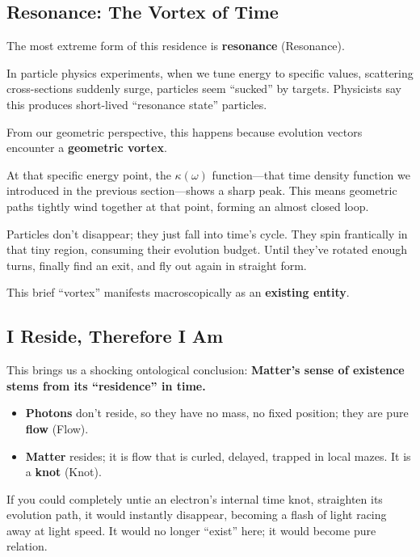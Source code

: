 \subsection{Resonance: The Vortex of Time}

The most extreme form of this residence is \textbf{resonance} (Resonance).

In particle physics experiments, when we tune energy to specific values, scattering cross-sections suddenly surge, particles seem ``sucked'' by targets. Physicists say this produces short-lived ``resonance state'' particles.

From our geometric perspective, this happens because evolution vectors encounter a \textbf{geometric vortex}.

At that specific energy point, the $\kappa(\omega)$ function---that time density function we introduced in the previous section---shows a sharp peak. This means geometric paths tightly wind together at that point, forming an almost closed loop.

Particles don't disappear; they just fall into time's cycle. They spin frantically in that tiny region, consuming their evolution budget. Until they've rotated enough turns, finally find an exit, and fly out again in straight form.

This brief ``vortex'' manifests macroscopically as an \textbf{existing entity}.

\subsection{I Reside, Therefore I Am}

This brings us a shocking ontological conclusion: \textbf{Matter's sense of existence stems from its ``residence'' in time.}

\begin{itemize}
\item \textbf{Photons} don't reside, so they have no mass, no fixed position; they are pure \textbf{flow} (Flow).

\item \textbf{Matter} resides; it is flow that is curled, delayed, trapped in local mazes. It is a \textbf{knot} (Knot).
\end{itemize}

If you could completely untie an electron's internal time knot, straighten its evolution path, it would instantly disappear, becoming a flash of light racing away at light speed. It would no longer ``exist'' here; it would become pure relation.

